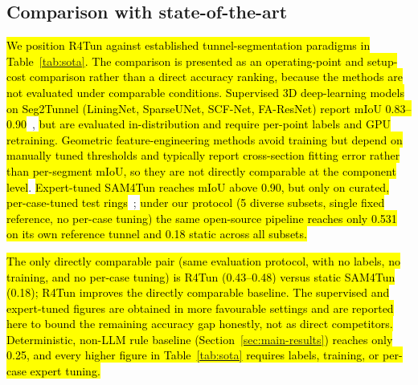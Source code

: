 \documentclass[a4paper,fleqn]{cas-dc}
\newcommand{\hlcite}[1]{\hl{\cite{#1}}}
\begin{document}
{%
\subsection{Comparison with state-of-the-art}\label{sec:positioning}

\hl{We position R4Tun against established tunnel-segmentation paradigms in Table~\ref{tab:sota}. The comparison is presented as an operating-point and setup-cost comparison rather than a direct accuracy ranking, because the methods are not evaluated under comparable conditions. Supervised 3D deep-learning models on Seg2Tunnel (LiningNet, SparseUNet, SCF-Net, FA-ResNet) report mIoU 0.83--0.90}~\hlcite{lin2024seg2tunnel}, \hl{but are evaluated in-distribution and require per-point labels and GPU retraining. Geometric feature-engineering methods avoid training but depend on manually tuned thresholds and typically report cross-section fitting error rather than per-segment mIoU, so they are not directly comparable at the component level}. \hl{Expert-tuned SAM4Tun reaches mIoU above 0.90, but only on curated, per-case-tuned test rings}~\hlcite{ye2025sam4tun}; \hl{under our protocol (5 diverse subsets, single fixed reference, no per-case tuning) the same open-source pipeline reaches only 0.531 on its own reference tunnel and 0.18 static across all subsets.}

\hl{The only directly comparable pair (same evaluation protocol, with no labels, no training, and no per-case tuning) is R4Tun (\mbox{0.43--0.48}) versus static SAM4Tun (0.18); R4Tun improves the directly comparable baseline. The supervised and expert-tuned figures are obtained in more favourable settings and are reported here to bound the remaining accuracy gap honestly, not as direct competitors. Deterministic, non-LLM rule baseline (Section~\ref{sec:main-results}) reaches only 0.25, and every higher figure in Table~\ref{tab:sota} requires labels, training, or per-case expert tuning.}

}
\end{document}
